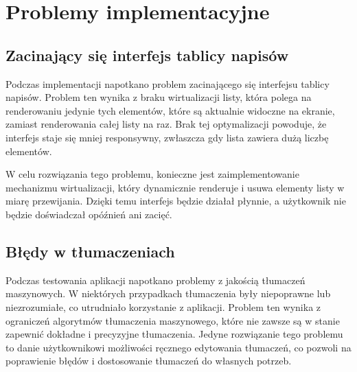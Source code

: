 
\section{Problemy implementacyjne}
\subsection{Zacinający się interfejs tablicy napisów}

Podczas implementacji napotkano problem zacinającego się interfejsu tablicy napisów. Problem ten wynika z braku wirtualizacji listy, która polega na renderowaniu jedynie tych elementów, które są aktualnie widoczne na ekranie, zamiast renderowania całej listy na raz. Brak tej optymalizacji powoduje, że interfejs staje się mniej responsywny, zwłaszcza gdy lista zawiera dużą liczbę elementów.

W celu rozwiązania tego problemu, konieczne jest zaimplementowanie mechanizmu wirtualizacji, który dynamicznie renderuje i usuwa elementy listy w miarę przewijania. Dzięki temu interfejs będzie działał płynnie, a użytkownik nie będzie doświadczał opóźnień ani zacięć.

\subsection{Błędy w tłumaczeniach}

Podczas testowania aplikacji napotkano problemy z jakością tłumaczeń maszynowych. W niektórych przypadkach tłumaczenia były niepoprawne lub niezrozumiałe, co utrudniało korzystanie z aplikacji. Problem ten wynika z ograniczeń algorytmów tłumaczenia maszynowego, które nie zawsze są w stanie zapewnić dokładne i precyzyjne tłumaczenia. Jedyne rozwiązanie tego problemu to danie użytkownikowi możliwości ręcznego edytowania tłumaczeń, co pozwoli na poprawienie błędów i dostosowanie tłumaczeń do własnych potrzeb.



